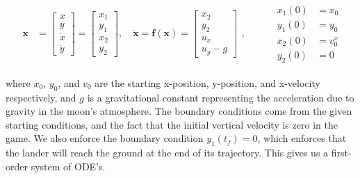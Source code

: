 \documentclass{article}
\begin{document}
\begin{align}\label{state_equation}
    \begin{aligned}
        \mathbf{x} &= \begin{bmatrix}
            x \\
            y \\
            \dot{x} \\
            \dot{y}
        \end{bmatrix} = \begin{bmatrix}
            x_1 \\
            y_1 \\
            x_2 \\ 
            y_2
        \end{bmatrix},  
        \quad \dot{\mathbf{x}} = \mathbf{f}(\mathbf{x}) =
        \begin{bmatrix}
            x_2 \\
            y_2 \\
            u_x \\
            u_y - g
        \end{bmatrix}
    \end{aligned}, \qquad
    &
    \begin{aligned}
        x_1(0) &= x_0 \\
        y_1(0) &= y_0 \\
        x_2(0) &= v_0^{x} \\
        y_2(0) &= 0
    \end{aligned}
\end{align}

where $x_0$, $y_0$, and $v_0$ are the starting x-position, y-position, and x-velocity respectively, and $g$ is a gravitational constant representing the acceleration due to gravity in the moon's atmosphere. The boundary conditions come from the given starting conditions, and the fact that the initial vertical velocity is zero in the game. We also enforce the boundary condition $y_1(t_f) = 0$, which enforces that the lander will reach the ground at the end of its trajectory. This gives us a first-order system of ODE's.
\end{document}

